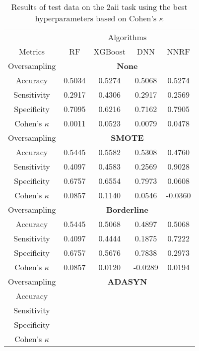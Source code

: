\begin{table}[!htb]
\centering
\caption{Results of test data on the 2aii task using the best hyperparameters based on Cohen's $\kappa$}
\label{tab:2aii_test_results}
\begin{tabular}{c | c c c c}
\hline
 & \multicolumn{4}{c}{Algorithms}\\ 
Metrics &RF & XGBoost & DNN & NNRF\\ 
\hline
Oversampling &\multicolumn{4}{|c}{\textbf{None}}\\ 
\hline
Accuracy & 0.5034 & 0.5274 & 0.5068 & 0.5274\\ 
Sensitivity & 0.2917 & 0.4306 & 0.2917 & 0.2569\\ 
Specificity & 0.7095 & 0.6216 & 0.7162 & 0.7905\\ 
Cohen's $\kappa$ & 0.0011 & 0.0523 & 0.0079 & 0.0478\\ 
\hline
Oversampling &\multicolumn{4}{|c}{\textbf{SMOTE}}\\ 
\hline
Accuracy & 0.5445 & 0.5582 & 0.5308 & 0.4760\\ 
Sensitivity & 0.4097 & 0.4583 & 0.2569 & 0.9028\\ 
Specificity & 0.6757 & 0.6554 & 0.7973 & 0.0608\\ 
Cohen's $\kappa$ & 0.0857 & 0.1140 & 0.0546 & -0.0360\\ 
\hline
Oversampling &\multicolumn{4}{|c}{\textbf{Borderline}}\\ 
\hline
Accuracy & 0.5445 & 0.5068 & 0.4897 & 0.5068\\ 
Sensitivity & 0.4097 & 0.4444 & 0.1875 & 0.7222\\ 
Specificity & 0.6757 & 0.5676 & 0.7838 & 0.2973\\ 
Cohen's $\kappa$ & 0.0857 & 0.0120 & -0.0289 & 0.0194\\ 
\hline
Oversampling &\multicolumn{4}{|c}{\textbf{ADASYN}}\\ 
\hline
Accuracy &  &  &  & \\ 
Sensitivity &  &  &  & \\ 
Specificity &  &  &  & \\ 
Cohen's $\kappa$ &  &  &  & \\ 
\hline
\end{tabular}
\end{table}

